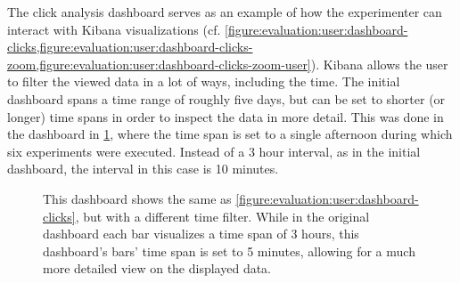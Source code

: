 The click analysis dashboard serves as an example of how the experimenter can interact with Kibana visualizations (cf. \cref{figure:evaluation:user:dashboard-clicks,figure:evaluation:user:dashboard-clicks-zoom,figure:evaluation:user:dashboard-clicks-zoom-user}).
Kibana allows the user to filter the viewed data in a lot of ways, including the time.
The initial dashboard spans a time range of roughly five days, but can be set to shorter (or longer) time spans in order to inspect the data in more detail.
This was done in the dashboard in \cref{figure:evaluation:user:dashboard-clicks-zoom}, where the time span is set to a single afternoon during which six experiments were executed.
Instead of a 3 hour interval, as in the initial dashboard, the interval in this case is 10 minutes.

\begin{figure}[t]
        \caption[Click dashboard with a more specific time filter.]{
        This dashboard shows the same as \cref{figure:evaluation:user:dashboard-clicks}, but with a different time filter.
	While in the original dashboard each bar visualizes a time span of 3 hours, this dashboard's bars' time span is set to 5 minutes, allowing for a much more detailed view on the displayed data.
        }
        \label{figure:evaluation:user:dashboard-clicks-zoom}
\end{figure}

